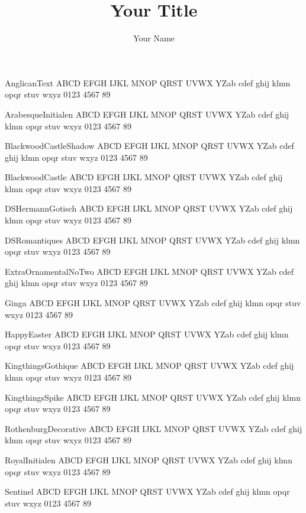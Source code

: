 \documentclass[10pt]{memoir}
\title{Your Title}
\author{Your Name}
\date{}
\newcommand{\blInitSz}{40}
\begin{document}
AnglicanText
{\blSetAnglicanText\fontsize{\blInitSz}{40}\selectfont 
ABCD EFGH IJKL MNOP QRST UVWX YZab cdef ghij klmn opqr stuv wxyz 0123 4567 89
} 

ArabesqueInitialen
{\blSetArabesqueInitialen\fontsize{\blInitSz}{40}\selectfont 
ABCD EFGH IJKL MNOP QRST UVWX YZab cdef ghij klmn opqr stuv wxyz 0123 4567 89
} 

BlackwoodCastleShadow
{\blSetBlackwoodCastleShadow\fontsize{\blInitSz}{40}\selectfont 
ABCD EFGH IJKL MNOP QRST UVWX YZab cdef ghij klmn opqr stuv wxyz 0123 4567 89
} 

BlackwoodCastle
{\blSetBlackwoodCastle\fontsize{\blInitSz}{40}\selectfont 
ABCD EFGH IJKL MNOP QRST UVWX YZab cdef ghij klmn opqr stuv wxyz 0123 4567 89
} 

DSHermannGotisch
{\blSetDSHermannGotisch\fontsize{\blInitSz}{40}\selectfont 
ABCD EFGH IJKL MNOP QRST UVWX YZab cdef ghij klmn opqr stuv wxyz 0123 4567 89
} 

DSRomantiques
{\blSetDSRomantiques\fontsize{\blInitSz}{40}\selectfont 
ABCD EFGH IJKL MNOP QRST UVWX YZab cdef ghij klmn opqr stuv wxyz 0123 4567 89
} 

ExtraOrnamentalNoTwo
{\blSetExtraOrnamentalNoTwo\fontsize{\blInitSz}{40}\selectfont 
ABCD EFGH IJKL MNOP QRST UVWX YZab cdef ghij klmn opqr stuv wxyz 0123 4567 89
} 

Ginga
{\blSetGinga\fontsize{\blInitSz}{40}\selectfont 
ABCD EFGH IJKL MNOP QRST UVWX YZab cdef ghij klmn opqr stuv wxyz 0123 4567 89
} 

HappyEaster
{\blSetHappyEaster\fontsize{\blInitSz}{40}\selectfont 
ABCD EFGH IJKL MNOP QRST UVWX YZab cdef ghij klmn opqr stuv wxyz 0123 4567 89
} 

KingthingsGothique
{\blSetKingthingsGothique\fontsize{\blInitSz}{40}\selectfont 
ABCD EFGH IJKL MNOP QRST UVWX YZab cdef ghij klmn opqr stuv wxyz 0123 4567 89
} 

KingthingsSpike
{\blSetKingthingsSpike\fontsize{\blInitSz}{40}\selectfont 
ABCD EFGH IJKL MNOP QRST UVWX YZab cdef ghij klmn opqr stuv wxyz 0123 4567 89
} 

RothenburgDecorative
{\blSetRothenburgDecorative\fontsize{\blInitSz}{40}\selectfont 
ABCD EFGH IJKL MNOP QRST UVWX YZab cdef ghij klmn opqr stuv wxyz 0123 4567 89
} 

RoyalInitialen
{\blSetRoyalInitialen\fontsize{\blInitSz}{40}\selectfont 
ABCD EFGH IJKL MNOP QRST UVWX YZab cdef ghij klmn opqr stuv wxyz 0123 4567 89
} 

Sentinel
{\blSetSentinel\fontsize{\blInitSz}{40}\selectfont 
ABCD EFGH IJKL MNOP QRST UVWX YZab cdef ghij klmn opqr stuv wxyz 0123 4567 89
} 
\end{document}
